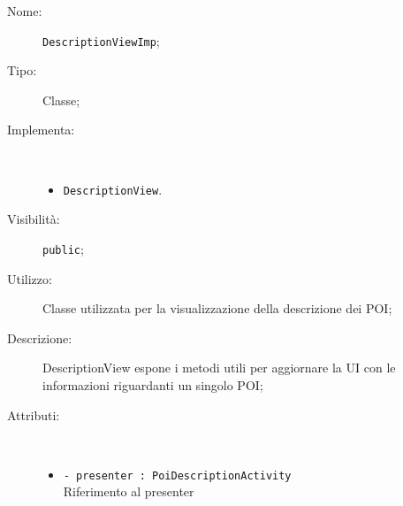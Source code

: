 \documentclass[../DefinizioneDiProdotto.tex]{subfiles}
\begin{document}
\begin{description}
	\item[Nome:] \texttt{DescriptionViewImp};
	\item[Tipo:] Classe;
	\item[Implementa:] \
	\begin{itemize}
		\item \texttt{DescriptionView}.
		
	\end{itemize}
	\item[Visibilità:] \texttt{public};
	\item[Utilizzo:] Classe utilizzata per la visualizzazione della descrizione dei POI;
	\item[Descrizione:] DescriptionView espone i metodi utili per aggiornare la UI con le informazioni riguardanti un singolo POI;
	\item[Attributi:] \
	\begin{itemize}
		\item \texttt{- presenter : PoiDescriptionActivity}\\
		Riferimento al presenter
		

\end{itemize}
\end{description}
\end{document}
